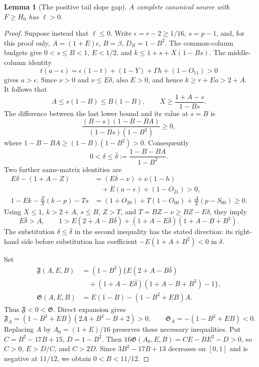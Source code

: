 \documentclass[11pt,reqno]{amsart}
\newtheorem{lemma}[theorem]{Lemma}
\theoremstyle{definition}
\theoremstyle{remark}
\begin{document}
\begin{lemma}[The positive tail slope gap]\label{s3:wall-ell-positive}
A complete canonical source with \(F\ge H_0\) has \(\ell>0\).
\end{lemma}
\begin{proof}
Suppose instead that \(\ell\le0\). Write
\(\epsilon=r-2\ge1/16\), \(s=p-1\), and, for this proof only,
\(A=(1+E)\epsilon\), \(B=\beta\), \(D_B=1-B^2\).
The common-column budgets give \(0<s\le B<1\), \(E<1/2\), and
\(k\le1+s+X(1-Bs)\). The middle-column identity
\[
 t(a-\epsilon)=\epsilon(1-t)+(1-Y)+\Gamma h+(1-O_{11})>0
\]
gives \(a>\epsilon\). Since \(\nu>0\) and
\(\nu\le E\delta\), also \(E>0\), and hence
\(k\ge r+Ea>2+A\). It follows that
\[
 A\le s(1-B)\le B(1-B),\qquad
 X\ge\frac{1+A-s}{1-Bs}.
\]
The difference between the last lower bound and its value at \(s=B\) is
\[
 \frac{(B-s)(1-B-BA)}{(1-Bs)(1-B^2)}\ge0,
\]
where \(1-B-BA\ge(1-B)(1-B^2)>0\). Consequently
\[
 0<\delta\le\bar\delta:=\frac{1-B-BA}{1-B^2}.
\]
Two further same-matrix identities are
\[
\begin{split}
 E\delta-(1+A-Z)
 &=(E\delta-\nu)+\nu(1-h)\\
 &\quad+E(a-\epsilon)+(1-O_{21})>0,\\
 1-Ek-\frac ZX(k-p)-Ts
 &=(1+O_{20})+T(1-O_{00})+\frac\Delta X(p-S_{00})\ge0.
\end{split}
\]
Using \(X\le1\), \(k>2+A\), \(s\le B\), \(Z>T\), and
\(T=BZ-\nu\ge BZ-E\delta\), they imply
\[
 E\bar\delta>A,\qquad
 1>E(2+A-B\bar\delta)
       +(1+A-E\bar\delta)(1+A-B+B^2).
\]
The substitution \(\delta\le\bar\delta\) in the second inequality
has the stated direction: its right-hand side before substitution has
coefficient \(-E(1+A+B^2)<0\) in \(\delta\).

Set
\[
\begin{split}
 \mathfrak F(A,E,B)&=(1-B^2)
   \bigl\{E(2+A-B\bar\delta)\\
  &\quad +(1+A-E\bar\delta)(1+A-B+B^2)-1\bigr\},\\
 \mathfrak G(A,E,B)&=E(1-B)-(1-B^2+EB)A.
\end{split}
\]
Thus \(\mathfrak F<0<\mathfrak G\). Direct expansion gives
\[
 \mathfrak F_A=(1-B^2+EB)(2A+B^2-B+2)>0,
 \qquad \mathfrak G_A=-(1-B^2+EB)<0.
\]
Replacing \(A\) by \(A_0=(1+E)/16\) preserves these necessary
inequalities. Put \(C=B^2-17B+15\), \(D=1-B^2\).
Then \(16\mathfrak G(A_0,E,B)=CE-BE^2-D>0\), so
\(C>0\), \(E>D/C\), and \(C>2D\). Since
\(3B^2-17B+13\) decreases on \([0,1]\) and is negative at
\(11/12\), we obtain \(0<B<11/12\).


\end{proof}
\end{document}
